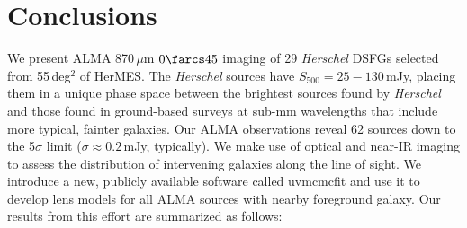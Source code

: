 \documentclass[iop]{emulateapj}
\begin{document}




\section{Conclusions} \label{sec:conclusions}

We present ALMA 870$\,\mu$m $0\farcs45$ imaging of 29 {\it Herschel} DSFGs
selected from 55$\,$deg$^2$ of HerMES.  The {\it Herschel} sources have
$S_{500} = 25 - 130\,$mJy, placing them in a unique phase space between the
brightest sources found by {\it Herschel} and those found in ground-based
surveys at sub-mm wavelengths that include more typical, fainter galaxies.  Our
ALMA observations reveal 62 sources down to the 5$\sigma$ limit ($\sigma
\approx 0.2\,$mJy, typically).  We make use of optical and near-IR imaging to
assess the distribution of intervening galaxies along the line of sight.  We
introduce a new, publicly available software called {\sc uvmcmcfit} and use it
to develop lens models for all ALMA sources with nearby foreground
galaxy.  Our results from this effort are summarized as follows:
\end{document}
